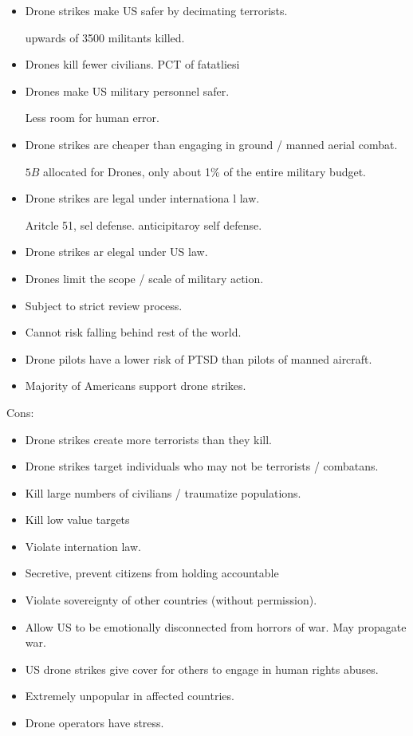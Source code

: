 \documentclass{article}
\begin{document}
\begin{itemize}
  \item Drone strikes make US safer by decimating terrorists.

    upwards of 3500 militants killed.

  \item Drones kill fewer civilians.  PCT of fatatliesi

  \item Drones make US military personnel safer.

    Less room for human error.

  \item Drone strikes are cheaper than engaging in ground / manned aerial combat.

    $5B$ allocated for Drones, only about 1\% of the entire military budget.

  \item Drone strikes are legal under internationa l law.

    Aritcle 51, sel defense. anticipitaroy self defense.

  \item Drone strikes ar elegal under US law.
  \item Drones limit the scope / scale of military action.
  \item Subject to strict review process.
  \item Cannot risk falling behind rest of the world.
  \item Drone pilots have a lower risk of PTSD than pilots of manned aircraft.
  \item Majority of Americans support drone strikes.
\end{itemize}

Cons:

\begin{itemize}
  \item Drone strikes create more terrorists than they kill.
  \item Drone strikes target individuals who may not be  terrorists / combatans.
  \item Kill large numbers of civilians / traumatize populations.
  \item Kill low value targets
  \item Violate internation law.
  \item Secretive, prevent citizens from holding accountable
  \item Violate sovereignty of other countries (without permission).
  \item Allow US to be emotionally disconnected from horrors of war.  May propagate war.
  \item US drone strikes give cover for others to engage in human rights abuses.
  \item Extremely unpopular in affected countries.
  \item Drone operators have stress.
\end{itemize}
\end{document}
